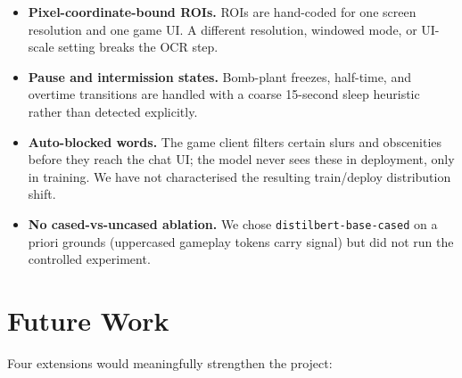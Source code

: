 \documentclass[a4paper,10.5pt,twoside]{article}
\begin{document}
\begin{itemize}
    \item \textbf{Pixel-coordinate-bound ROIs.} ROIs are hand-coded for one screen resolution and one game UI. A different resolution, windowed mode, or UI-scale setting breaks the OCR step.

    \item \textbf{Pause and intermission states.} Bomb-plant freezes, half-time, and overtime transitions are handled with a coarse 15-second sleep heuristic rather than detected explicitly.

    \item \textbf{Auto-blocked words.} The game client filters certain slurs and obscenities before they reach the chat UI; the model never sees these in deployment, only in training. We have not characterised the resulting train/deploy distribution shift.

    \item \textbf{No cased-vs-uncased ablation.} We chose \texttt{distilbert-base-cased} on a priori grounds (uppercased gameplay tokens carry signal) but did not run the controlled experiment.
\end{itemize}


\section{Future Work}\label{sec:future-work}

Four extensions would meaningfully strengthen the project:
\end{document}
